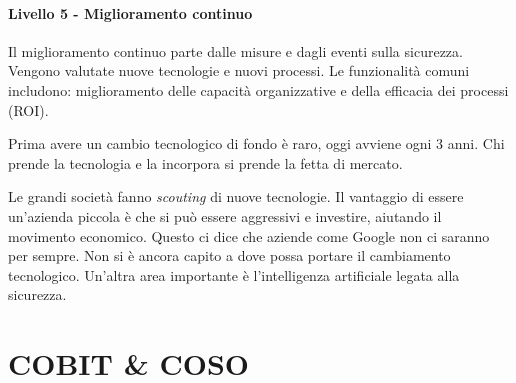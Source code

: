 \paragraph{Livello 5 - Miglioramento continuo}

Il miglioramento continuo parte dalle misure e dagli eventi sulla sicurezza.
Vengono valutate nuove tecnologie e nuovi processi. Le funzionalità comuni 
includono: miglioramento delle capacità organizzative e della efficacia dei 
processi (ROI).

Prima avere un cambio tecnologico di fondo è raro, oggi avviene ogni 3 anni. Chi 
prende la tecnologia e la incorpora si prende la fetta di mercato.

Le grandi società fanno \textit{scouting} di nuove tecnologie. Il vantaggio di 
essere un'azienda piccola è che si può essere aggressivi e investire, aiutando 
il movimento economico. Questo ci dice che aziende come Google non ci 
saranno per sempre. Non si è ancora capito a dove possa portare il cambiamento
tecnologico. Un'altra area importante è l'intelligenza artificiale legata 
alla sicurezza.


\section{COBIT \& COSO}

